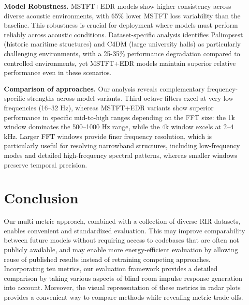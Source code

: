 \documentclass[conference]{IEEEtran}
\begin{document}
\textbf{Model Robustness.}
MSTFT+\-EDR models show higher consistency across diverse acoustic environments, with 65\% lower MSTFT loss variability than the baseline. This robustness is crucial for deployment where models must perform reliably across acoustic conditions. Dataset-specific analysis identifies Palimpsest (historic maritime structures) and C4DM (large university halls) as particularly challenging environments, with a 25-35\% performance degradation compared to controlled environments, yet MSTFT+EDR models maintain superior relative performance even in these scenarios. 
 
\textbf{Comparison of approaches.} Our analysis reveals complementary frequency-specific strengths across model variants. Third-octave filters excel at very low frequencies (16--32 Hz), whereas MSTFT+EDR variants show superior performance in specific mid-to-high ranges depending on the FFT size: the 1k window dominates the 500--1000 Hz range, while the 4k window excels at 2--4 kHz. Larger FFT windows provide finer frequency resolution, which is particularly useful for resolving
narrowband structures, including low-frequency modes and detailed high-frequency spectral patterns, whereas smaller windows preserve temporal precision.
 
 
\section{Conclusion}
 

Our multi-metric approach, combined with a collection of diverse RIR datasets, enables convenient and standardized evaluation. This may improve comparability between future models without requiring access to codebases that are often not publicly available, and may enable more energy-efficient evaluation by allowing reuse of published results instead of retraining competing approaches. Incorporating ten metrics, our evaluation framework provides a detailed comparison by taking various aspects of blind room impulse response generation into account. Moreover, the visual representation of these metrics in radar plots provides a convenient way to compare methods while revealing metric trade-offs.
\end{document}
